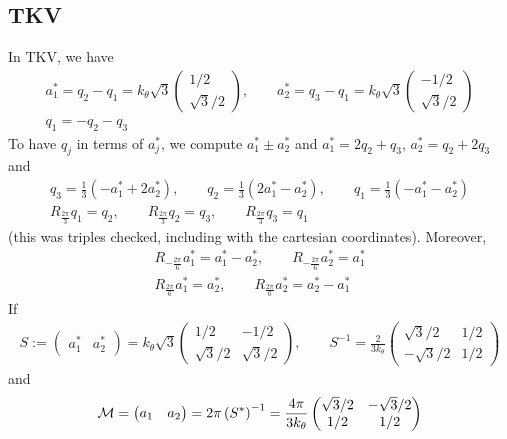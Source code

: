 \documentclass[11pt,a4paper,reqno,french,tikz]{amsart}
\newcommand{\pa}[1]{\left( #1 \right)} %
\newcommand{\f}[2]{\frac{#1}{#2}} %
\newcommand{\mat}[1]{\begin{pmatrix} #1 \end{pmatrix}} %
\begin{document}
\subsection{TKV}%
\label{sub:tkv}

In TKV, we have
\begin{multline*}
	a_1^* = q_2 - q_1 = k_\theta \sqrt{3} \mat{1/2 \\ \sqrt{3}/2},\qquad a_2^* = q_3 - q_1 = k_\theta \sqrt{3} \mat{-1/2 \\ \sqrt{3}/2} \\
	q_1 = -q_2 - q_3
\end{multline*}
To have $q_j$ in terms of $a_j^*$, we compute $a_1^* \pm a_2^*$ and $a_1^* = 2q_2 + q_3$, $a_2^* = q_2 + 2 q_3$ and
\begin{align*}
q_3 = \f 13 \pa{-a_1^* + 2 a_2^*},\qquad q_2 = \f 13 \pa{ 2 a_1^* - a_2^*},\qquad q_1 = \f 13 \pa{-a_1^* - a_2^*} \\
R_{\f{2\pi}{3}} q_1 = q_2,\qquad R_{\f{2\pi}{3}} q_2 = q_3,\qquad R_{\f{2\pi}{3}} q_3 = q_1
\end{align*}
(this was triples checked, including with the cartesian coordinates). Moreover,
\begin{multline*}
R_{-\f{2\pi}{6}} a_1^* = a_1^* - a_2^*,\qquad R_{-\f{2\pi}{6}} a_2^* = a_1^* \\
R_{\f{2\pi}{6}} a_1^* = a_2^*,\qquad R_{\f{2\pi}{6}} a_2^* = a_2^* - a_1^*
\end{multline*}
If 
\begin{align*}
	S := \mat{a_1^* & a_2^*} = k_\theta \sqrt{3} \mat{1/2 & -1/2 \\ \sqrt{3}/2 & \sqrt{3}/2}, \qquad S^{-1} = \f{2}{3 k_\theta} \mat{\sqrt{3}/2 & 1/2 \\ -\sqrt{3}/2 & 1/2}
\end{align*}
and
\begin{align*}
\cM = \mat{a_1 & a_2} = 2\pi \pa{S^*}^{-1} = \f{4\pi}{3k_\theta} \mat{\sqrt{3}/2 & - \sqrt{3}/2 \\ 1/2 & 1/2}
\end{align*}
\end{document}
